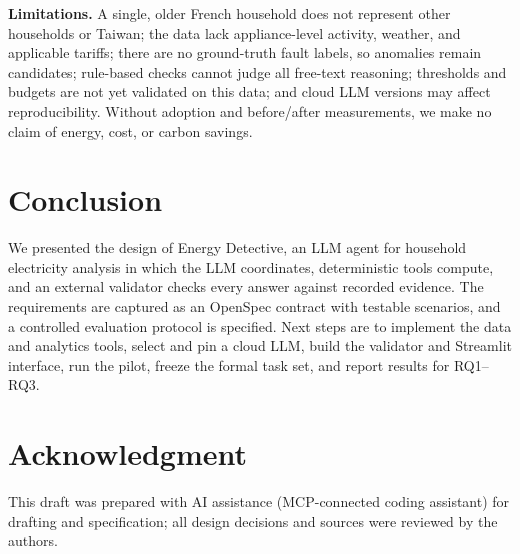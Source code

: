 \documentclass[conference]{IEEEtran}
\begin{document}
\textbf{Limitations.} A single, older French household does not
represent other households or Taiwan; the data lack appliance-level
activity, weather, and applicable tariffs; there are no ground-truth
fault labels, so anomalies remain candidates; rule-based checks cannot
judge all free-text reasoning; thresholds and budgets are not yet
validated on this data; and cloud LLM versions may affect
reproducibility. Without adoption and before/after measurements, we
make no claim of energy, cost, or carbon savings.

\section{Conclusion}

We presented the design of Energy Detective, an LLM agent for
household electricity analysis in which the LLM coordinates,
deterministic tools compute, and an external validator checks every
answer against recorded evidence. The requirements are captured as an
OpenSpec contract with testable scenarios, and a controlled evaluation
protocol is specified. Next steps are to implement the data and
analytics tools, select and pin a cloud LLM, build the validator and
Streamlit interface, run the pilot, freeze the formal task set, and
report results for RQ1--RQ3.

\section*{Acknowledgment}
This draft was prepared with AI assistance (MCP-connected coding
assistant) for drafting and specification; all design decisions and
sources were reviewed by the authors.



\end{document}
